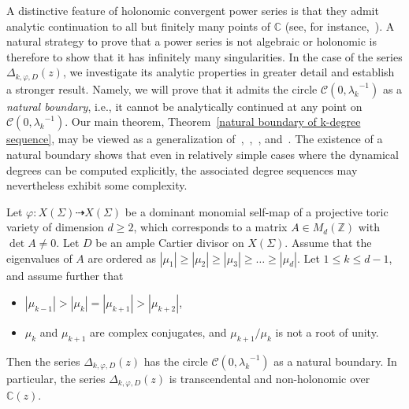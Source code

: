 \documentclass[11pt,a4paper]{article}
\theoremstyle{plain}
\theoremstyle{remark}
\theoremstyle{custombold}
\newenvironment{customtheorem}[1]
  {\renewcommand\theinnercustomtheorem{#1}\innercustomtheorem}
  {\endinnercustomtheorem}
\begin{document}
 

 
 A distinctive feature of holonomic convergent power series is that they admit analytic continuation to all but finitely many points of 
$\mathbb C$ (see, for instance,~\cite[Theorems~2.1 and 4(a)]{Stanley-1980}). A natural strategy to prove that a power series is not algebraic or holonomic is therefore to show that it has infinitely many singularities. In the case of the series $\Delta_{k,\varphi,D}(z)$, we investigate its analytic properties in greater detail and establish a stronger result. Namely, we will prove that it admits the circle $\mathcal{C}(0,{\lambda_k}^{-1})$ as a \emph{natural boundary}, i.e., it cannot be analytically continued at any point on $\mathcal{C}(0,{\lambda_k}^{-1})$. Our main theorem, Theorem~\ref{natural boundary of k-degree sequence}, may be viewed as a generalization of~\cite[Th\'eor\`eme principal]{Favre-2003},~\cite[Theorem~1.1]{Bedford-Kim-2004},~\cite[Proposition~7.6]{Hasselblatt-Propp-2007}, and~\cite[Theorem~C]{Lin-Wulcan-2014}. The existence of a natural boundary shows that even in relatively simple cases where the dynamical degrees can be computed explicitly, the associated degree sequences may nevertheless exhibit some complexity.

\begin{customtheorem}{A}
\label{natural boundary of k-degree sequence}
     Let $\varphi\colon X(\Sigma)\dashrightarrow X(\Sigma)$ be a dominant monomial self-map of a projective toric variety of dimension $d\geq2$, which corresponds to a matrix $A \in M_d(\mathbb Z)$ with $\det A\neq0$.  Let $D$ be an ample Cartier divisor on $X(\Sigma)$.  Assume that the eigenvalues of $A$ are ordered as $|\mu_1|\geq|\mu_2|\geq|\mu_3|\geq\ldots\geq| \mu_d|$.
     Let $1\leq k\leq d-1$, and assume further that 
     \begin{itemize}
         \item $|\mu_{k-1}|>|\mu_k|=|\mu_{k+1}|>|\mu_{k+2}|$,
         \item $\mu_{k}$ and $\mu_{k+1}$ are complex conjugates, and $\mu_{k+1}/\mu_{k}$ is not a root of unity.
     \end{itemize}
     Then the series $\Delta_{k,\varphi,D}(z)$ has the circle $\mathcal{C}(0,{\lambda_k}^{-1})$ as a natural boundary. In particular, the series $\Delta_{k,\varphi,D}(z)$ is transcendental and non-holonomic over $\mathbb{C}(z)$. 
\end{customtheorem}
\end{document}
